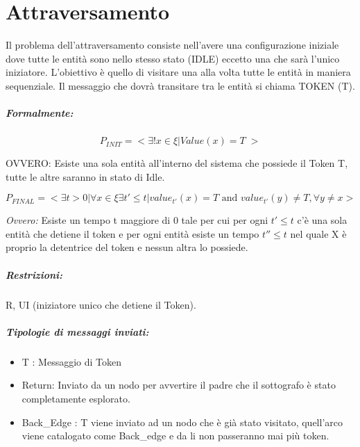 \chapter{Attraversamento}

Il problema dell'attraversamento consiste nell'avere una
configurazione iniziale dove tutte le entità sono nello stesso stato (IDLE)
eccetto una che sarà l'unico iniziatore. L'obiettivo è quello di visitare una
alla volta tutte le entità in maniera sequenziale. Il messaggio che dovrà
transitare tra le entità si chiama TOKEN (T).

\paragraph{Formalmente:}

$$
    P_{INIT} = <\exists ! x \in \xi | Value(x) = T \;>
$$

OVVERO: Esiste una sola entità all'interno del sistema che possiede il
Token T, tutte le altre saranno in stato di Idle.

$$
    P_{FINAL} = <\exists t>0 | \forall x \in \xi \exists t' \leq t | value_{t'}(x)
    = T \text{ and } value_{t'}(y) \neq T, \forall y \neq x >
$$

\textit{Ovvero:} Esiste un tempo t maggiore di 0 tale per cui per ogni $t' \leq
    t$ c'è una sola entità che detiene il token e per ogni entità esiste un tempo
$t'' \leq t$ nel quale X è proprio la detentrice del token e nessun altra lo
possiede.

\paragraph{Restrizioni:} R, UI (iniziatore unico che detiene il Token).

\paragraph{Tipologie di messaggi inviati:}
\begin{itemize}
    \item T : Messaggio di Token
    \item Return: Inviato da un nodo per avvertire il padre che il sottografo è
          stato completamente esplorato.
    \item Back\_Edge : T viene inviato ad un nodo che è già stato visitato,
          quell'arco viene catalogato come Back\_edge e da li non passeranno mai più
          token.
\end{itemize}

